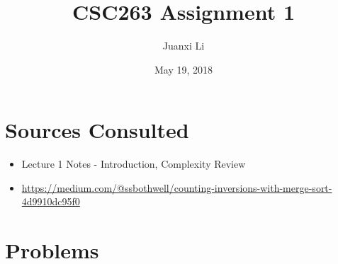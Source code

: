 \documentclass{article}
\title{CSC263 Assignment 1}
\author{Juanxi Li}
\date{May 19, 2018}
\begin{document}
\maketitle

\section*{Sources Consulted}

\begin{itemize}
    \item Lecture 1 Notes - Introduction, Complexity Review
    \item \url{https://medium.com/@ssbothwell/counting-inversions-with-merge-sort-4d9910dc95f0}

\end{itemize}

\section*{Problems}
\end{document}
